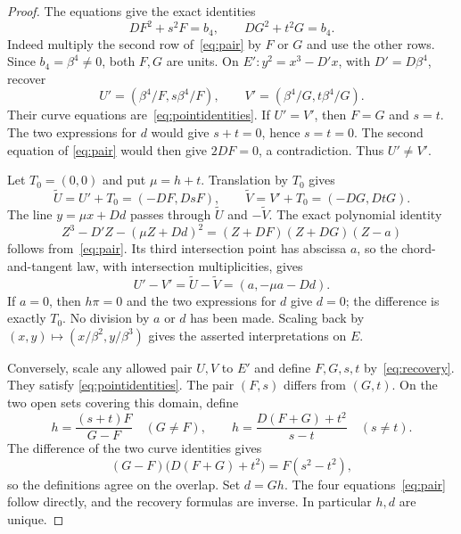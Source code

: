 \documentclass[11pt,a4paper]{article}
\begin{document}
\begin{proof}
The equations give the exact identities
\begin{equation}\label{eq:pointidentities}
                  DF^2+s^2F=b_4,\qquad DG^2+t^2G=b_4.
\end{equation}
Indeed multiply the second row of~\eqref{eq:pair} by $F$ or $G$
and use the other rows. Since $b_4=\beta^4\ne0$, both $F,G$ are
units. On $E':y^2=x^3-D'x$, with $D'=D\beta^4$, recover
\begin{equation}\label{eq:recovery}
              U'=(\beta^4/F,s\beta^4/F),\qquad
              V'=(\beta^4/G,t\beta^4/G).
\end{equation}
Their curve equations are~\eqref{eq:pointidentities}.
If $U'=V'$, then $F=G$ and $s=t$. The two expressions for $d$
would give $s+t=0$, hence $s=t=0$. The second equation of
\eqref{eq:pair} would then give $2DF=0$, a contradiction.
Thus $U'\ne V'$.

Let $T_0=(0,0)$ and put $\mu=h+t$. Translation by $T_0$ gives
\[
         \widetilde U=U'+T_0=(-DF,DsF),\qquad
         \widetilde V=V'+T_0=(-DG,DtG).
\]
The line $y=\mu x+Dd$ passes through $\widetilde U$ and
$-\widetilde V$. The exact polynomial identity
\begin{equation}\label{eq:linefactor}
 Z^3-D'Z-(\mu Z+Dd)^2=(Z+DF)(Z+DG)(Z-a)
\end{equation}
follows from~\eqref{eq:pair}. Its third intersection point has
abscissa $a$, so the chord-and-tangent law, with intersection
multiplicities, gives
\[
               U'-V'=\widetilde U-\widetilde V
                     =(a,-\mu a-Dd).
\]
If $a=0$, then $h\pi=0$ and the two expressions for $d$ give
$d=0$; the difference is exactly $T_0$. No division by $a$ or $d$
has been made. Scaling back by $(x,y)\mapsto(x/\beta^2,y/\beta^3)$
gives the asserted interpretations on $E$.

Conversely, scale any allowed pair $U,V$ to $E'$ and define
$F,G,s,t$ by~\eqref{eq:recovery}. They satisfy
\eqref{eq:pointidentities}. The pair $(F,s)$ differs from $(G,t)$.
On the two open sets covering this domain, define
\begin{equation}\label{eq:inverseh}
 h=\frac{(s+t)F}{G-F}\quad(G\ne F),\qquad
 h=\frac{D(F+G)+t^2}{s-t}\quad(s\ne t).
\end{equation}
The difference of the two curve identities gives
\[
       (G-F)\bigl(D(F+G)+t^2\bigr)=F(s^2-t^2),
\]
so the definitions agree on the overlap. Set $d=Gh$.
The four equations~\eqref{eq:pair} follow directly, and the
recovery formulas are inverse. In particular $h,d$ are unique.


\end{proof}
\end{document}
